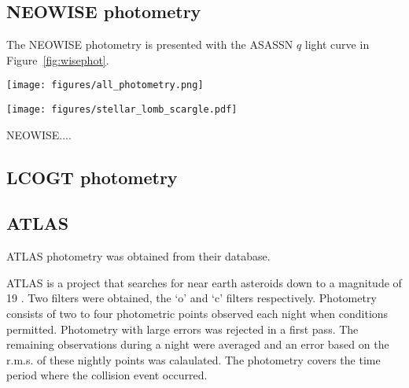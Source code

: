 \documentclass{aa}
\begin{document}
\subsection{NEOWISE photometry}

The NEOWISE photometry is presented with the ASASSN $q$ light curve in Figure~\ref{fig:wisephot}.

\begin{figure*}
\begin{centering}
\texttt{[image: figures/all\_photometry.png]}
\caption{NEOWISE $W1$ and $W2$ photometry of the star, with the WISE color in the lowest panel.
%
The $NEOWISE$ color changes from colourless to very red, which fades back towards colourless over $\sim 500$ days.
}
\label{fig:wisephot}
\end{centering}
\end{figure*}


\begin{figure*}
\begin{centering}
\texttt{[image: figures/stellar\_lomb\_scargle.pdf]}
\caption{ASASSN photometry of ASASSN-21qj and the Lomb Scargle periodograms of the photometry in and out of the eclipse.
%
The blue and orange shaded regions in the top panel indicate the range of epochs put into the Lomb Scargle periodogram.
%
Middle panel: The periodograms over a range of 0 to 150 days.
%
Lower panel: The periodogram of the star outside of the eclipse over a range of 0 to 50 days.
}
\label{fig:starlombscargle}
\end{centering}
\end{figure*}



NEOWISE....



\subsection{LCOGT photometry}

\subsection{ATLAS}

ATLAS photometry was obtained from their database.



ATLAS is a project that searches for near earth asteroids down to a magnitude of 19 
\citep{Tonry18}.
%
Two filters were obtained, the `o' and `c' filters respectively.
%
Photometry consists of two to four photometric points observed each night when conditions permitted.
%
Photometry with large errors was rejected in a first pass.
%
The remaining observations during a night were averaged and an error based on the r.m.s. of these nightly points was calaulated.
%
The photometry covers the time period where the collision event occurred. 
\end{document}
